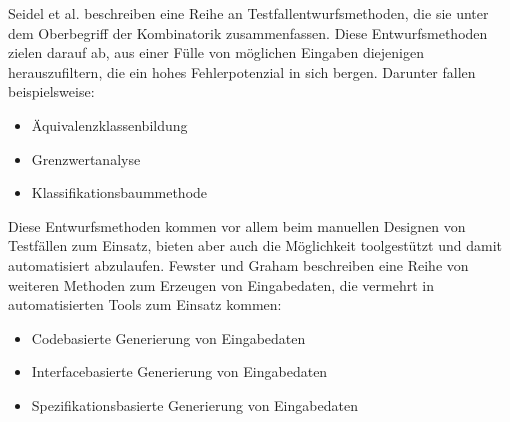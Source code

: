 Seidel et al. \cite[vgl. S. 27]{seidl_basiswissen_2012} beschreiben eine Reihe an Testfallentwurfsmethoden, die sie unter dem Oberbegriff der Kombinatorik zusammenfassen. Diese Entwurfsmethoden zielen darauf ab, aus einer Fülle von möglichen Eingaben diejenigen herauszufiltern, die ein hohes Fehlerpotenzial in sich bergen. Darunter fallen beispielsweise:
\begin{itemize}
\item Äquivalenzklassenbildung
\item Grenzwertanalyse
\item Klassifikationsbaummethode
\end{itemize}
Diese Entwurfsmethoden kommen vor allem beim manuellen Designen von Testfällen zum Einsatz, bieten aber auch die Möglichkeit toolgestützt und damit automatisiert abzulaufen.
Fewster und Graham \cite[vgl. S. 19 ff.]{fewster_software_1999} beschreiben eine Reihe von weiteren Methoden zum Erzeugen von Eingabedaten, die vermehrt in automatisierten Tools zum Einsatz kommen:
\begin{itemize}
\item Codebasierte Generierung von Eingabedaten
\item Interfacebasierte Generierung von Eingabedaten
\item Spezifikationsbasierte Generierung von Eingabedaten
\end{itemize}

